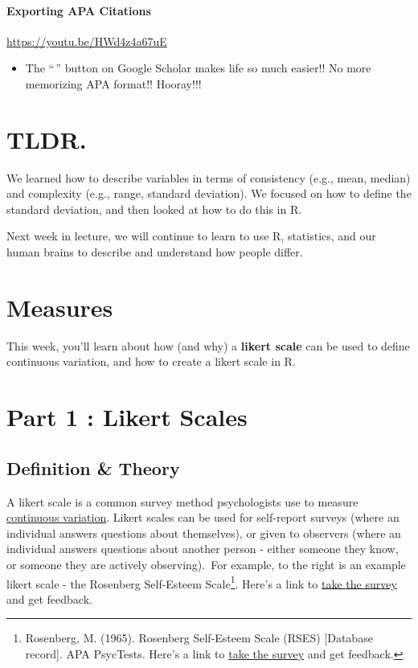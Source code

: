 \documentclass[
  letterpaper,
  DIV=11,
  numbers=noendperiod,
  oneside]{scrreprt}
\providecommand{\tightlist}{%
  \setlength{\itemsep}{0pt}\setlength{\parskip}{0pt}}\usepackage{longtable,booktabs,array}
\begin{document}
\subsubsection{Exporting APA Citations}\label{exporting-apa-citations}

\url{https://youtu.be/HWd4z4a67uE}

\begin{itemize}
\tightlist
\item
  The ``\,'' button on Google Scholar makes life so much easier!! No
  more memorizing APA format!! Hooray!!!
\end{itemize}

\chapter{TLDR.}\label{tldr.}

We learned how to describe variables in terms of consistency (e.g.,
mean, median) and complexity (e.g., range, standard deviation). We
focused on how to define the standard deviation, and then looked at how
to do this in R.

Next week in lecture, we will continue to learn to use R, statistics,
and our human brains to describe and understand how people differ.

\chapter{Measures}\label{measures}

This week, you'll learn about how (and why) a \textbf{likert scale} can
be used to define continuous variation, and how to create a likert scale
in R.

\chapter{Part 1 : Likert Scales}\label{part-1-likert-scales}

\section{Definition \& Theory}\label{definition-theory}

A likert scale is a common survey method psychologists use to measure
\href{https://docs.google.com/document/d/18nv4NsyRkjP3ClgreidOOWyxS3VdSQPpT2kRwfTHvm0/edit\#bookmark=id.hco904ai8j6f}{continuous
variation}. Likert scales can be used for self-report surveys (where an
individual answers questions about themselves), or given to observers
(where an individual answers questions about another person - either
someone they know, or someone they are actively observing).~For example,
to the right is an example likert scale - the Rosenberg Self-Esteem
Scale\footnote{Rosenberg, M. (1965). Rosenberg Self-Esteem Scale (RSES)
  {[}Database record{]}. APA PsycTests. Here's a link to
  \href{https://www.wwnorton.com/college/psych/psychsci/media/rosenberg.htm}{take
  the survey} and get feedback.

  \hfill\break
}. Here's a link to
\href{https://www.wwnorton.com/college/psych/psychsci/media/rosenberg.htm}{take
the survey} and get feedback.
\end{document}
